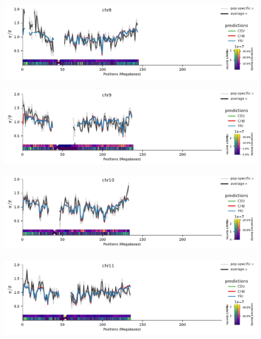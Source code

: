 \documentclass[11pt]{article}
\begin{document}
\begin{figure}[!htb]
  \centering
  \includegraphics[width=\textwidth]{figures/supplementary/pred_plot_chr8.pdf}
  \label{suppfig:fit-chr8}
\end{figure}


\begin{figure}[!htb]
  \centering
  \includegraphics[width=\textwidth]{figures/supplementary/pred_plot_chr9.pdf}
  \label{suppfig:fit-chr9}
\end{figure}


\begin{figure}[!htb]
  \centering
  \includegraphics[width=\textwidth]{figures/supplementary/pred_plot_chr10.pdf}
  \label{suppfig:fit-chr10}
\end{figure}


\begin{figure}[!htb]
  \centering
  \includegraphics[width=\textwidth]{figures/supplementary/pred_plot_chr11.pdf}
  \label{suppfig:fit-chr11}
\end{figure}
\end{document}
